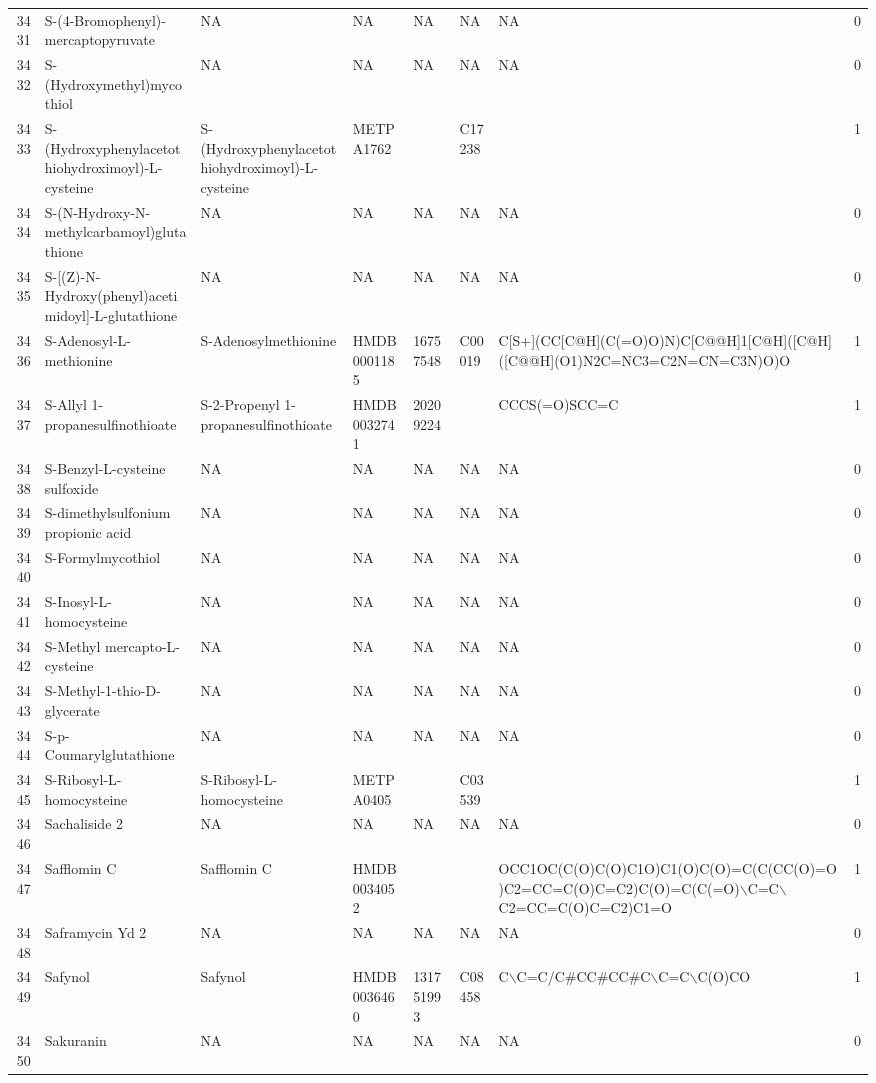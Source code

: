 \documentclass[a4paper]{article}
\begin{document}
\begin{longtable}{rlllllll}
  3431 & S-(4-Bromophenyl)-mercaptopyruvate & NA & NA & NA & NA & NA & 0 \\ 
  3432 & S-(Hydroxymethyl)mycothiol & NA & NA & NA & NA & NA & 0 \\ 
  3433 & S-(Hydroxyphenylacetothiohydroximoyl)-L-cysteine & S-(Hydroxyphenylacetothiohydroximoyl)-L-cysteine & METPA1762 &  & C17238 &  & 1 \\ 
  3434 & S-(N-Hydroxy-N-methylcarbamoyl)glutathione & NA & NA & NA & NA & NA & 0 \\ 
  3435 & S-[(Z)-N-Hydroxy(phenyl)acetimidoyl]-L-glutathione & NA & NA & NA & NA & NA & 0 \\ 
  3436 & S-Adenosyl-L-methionine & S-Adenosylmethionine & HMDB0001185 & 16757548 & C00019 & C[S+](CC[C@H](C(=O)O)N)C[C@@H]1[C@H]([C@H]([C@@H](O1)N2C=NC3=C2N=CN=C3N)O)O & 1 \\ 
  3437 & S-Allyl 1-propanesulfinothioate & S-2-Propenyl 1-propanesulfinothioate & HMDB0032741 & 20209224 &  & CCCS(=O)SCC=C & 1 \\ 
  3438 & S-Benzyl-L-cysteine sulfoxide & NA & NA & NA & NA & NA & 0 \\ 
  3439 & S-dimethylsulfonium propionic acid & NA & NA & NA & NA & NA & 0 \\ 
  3440 & S-Formylmycothiol & NA & NA & NA & NA & NA & 0 \\ 
  3441 & S-Inosyl-L-homocysteine & NA & NA & NA & NA & NA & 0 \\ 
  3442 & S-Methyl mercapto-L-cysteine & NA & NA & NA & NA & NA & 0 \\ 
  3443 & S-Methyl-1-thio-D-glycerate & NA & NA & NA & NA & NA & 0 \\ 
  3444 & S-p-Coumarylglutathione & NA & NA & NA & NA & NA & 0 \\ 
  3445 & S-Ribosyl-L-homocysteine & S-Ribosyl-L-homocysteine & METPA0405 &  & C03539 &  & 1 \\ 
  3446 & Sachaliside 2 & NA & NA & NA & NA & NA & 0 \\ 
  3447 & Safflomin C & Safflomin C & HMDB0034052 &  &  & OCC1OC(C(O)C(O)C1O)C1(O)C(O)=C(C(CC(O)=O)C2=CC=C(O)C=C2)C(O)=C(C(=O)$\backslash$C=C$\backslash$C2=CC=C(O)C=C2)C1=O & 1 \\ 
  3448 & Saframycin Yd 2 & NA & NA & NA & NA & NA & 0 \\ 
  3449 & Safynol & Safynol & HMDB0036460 & 131751993 & C08458 & C$\backslash$C=C/C\#CC\#CC\#C$\backslash$C=C$\backslash$C(O)CO & 1 \\ 
  3450 & Sakuranin & NA & NA & NA & NA & NA & 0 \\ 

\end{longtable}
\end{document}

